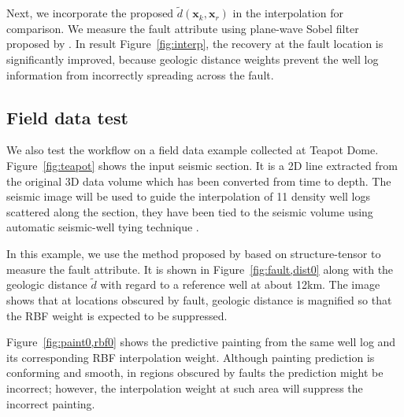 Next, we incorporate the proposed $\tilde d(\mathbf{x}_k,\mathbf{x}_r)$ in the interpolation for comparison.
We measure the fault attribute using plane-wave Sobel filter proposed by \cite{sobel}.
In result Figure~\ref{fig:interp}, the recovery at the fault location is significantly improved, because geologic distance weights prevent the well log information from incorrectly spreading across the fault.

\subsection{Field data test}
We also test the workflow on a field data example collected at Teapot Dome.
Figure~\ref{fig:teapot} shows the input seismic section.
It is a 2D line extracted from the original 3D data volume which has been converted from time to depth.
The seismic image will be used to guide the interpolation of 11 density well logs scattered along the section, they have been tied to the seismic volume using automatic seismic-well tying technique \cite[]{wu}.


In this example, we use the method proposed by \cite{faultlike} based on structure-tensor to measure the fault attribute.
It is shown in Figure~\ref{fig:fault,dist0} along with the geologic distance $\tilde d$ with regard to a reference well at about 12km.
The image shows that at locations obscured by fault, geologic distance is magnified so that the RBF weight is expected to be suppressed.


Figure~\ref{fig:paint0,rbf0} shows the predictive painting from the same well log and its corresponding RBF interpolation weight.
Although painting prediction is conforming and smooth, in regions obscured by faults the prediction might be incorrect; however, the interpolation weight at such area will suppress the incorrect painting.


